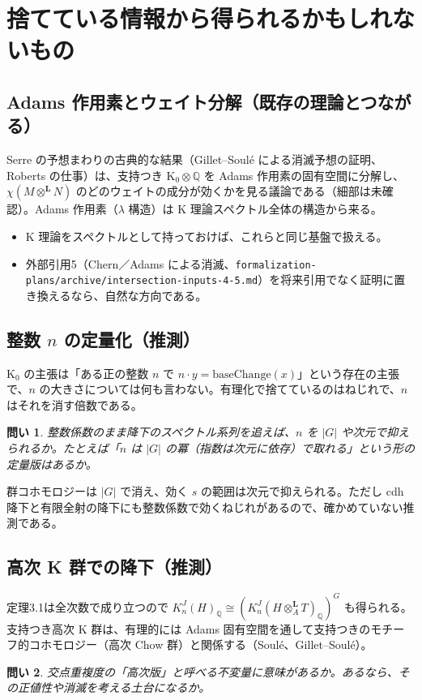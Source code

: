 \documentclass[11pt,a4paper]{ltjsarticle}
\theoremstyle{plain}
\newtheorem{question}{問い}
\theoremstyle{definition}
\theoremstyle{remark}
\newcommand{\Q}{\mathbb{Q}}
\newcommand{\Lotimes}{\otimes^{\mathbf{L}}}
\begin{document}
\section{捨てている情報から得られるかもしれないもの}

\subsection{Adams 作用素とウェイト分解（既存の理論とつながる）}
Serre の予想まわりの古典的な結果（Gillet--Soulé による消滅予想の証明、Roberts の仕事）は、支持つき K$_0 \otimes \Q$ を Adams 作用素の固有空間に分解し、$\chi(M \Lotimes N)$ のどのウェイトの成分が効くかを見る議論である（細部は未確認）。Adams 作用素（$\lambda$ 構造）は K 理論スペクトル全体の構造から来る。
\begin{itemize}
  \item K 理論をスペクトルとして持っておけば、これらと同じ基盤で扱える。
  \item 外部引用5（Chern／Adams による消滅、\texttt{formalization-plans/archive/intersection-inputs-4-5.md}）を将来引用でなく証明に置き換えるなら、自然な方向である。
\end{itemize}

\subsection{整数 $n$ の定量化（推測）}
K$_0$ の主張は「ある正の整数 $n$ で $n\cdot y = \mathrm{baseChange}(x)$」という存在の主張で、$n$ の大きさについては何も言わない。有理化で捨てているのはねじれで、$n$ はそれを消す倍数である。
\begin{question}
整数係数のまま降下のスペクトル系列を追えば、$n$ を $|G|$ や次元で抑えられるか。たとえば「$n$ は $|G|$ の冪（指数は次元に依存）で取れる」という形の定量版はあるか。
\end{question}
群コホモロジーは $|G|$ で消え、効く $s$ の範囲は次元で抑えられる。ただし cdh 降下と有限全射の降下にも整数係数で効くねじれがあるので、確かめていない推測である。

\subsection{高次 K 群での降下（推測）}
定理3.1は全次数で成り立つので $K_n^J(H)_\Q \cong (K_n^J(H\Lotimes_A T)_\Q)^G$ も得られる。支持つき高次 K 群は、有理的には Adams 固有空間を通して支持つきのモチーフ的コホモロジー（高次 Chow 群）と関係する（Soulé、Gillet--Soulé）。
\begin{question}
交点重複度の「高次版」と呼べる不変量に意味があるか。あるなら、その正値性や消滅を考える土台になるか。
\end{question}
\end{document}
